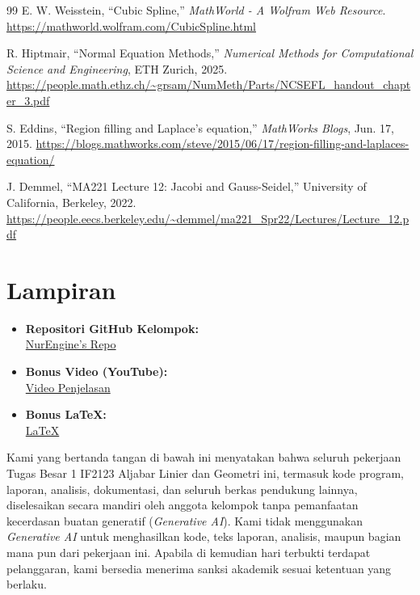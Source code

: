 \documentclass[12pt,a4paper]{report}
\begin{document}
\begin{thebibliography}{99}
E. W. Weisstein, ``Cubic Spline,'' \textit{MathWorld - A Wolfram Web Resource}.
\url{https://mathworld.wolfram.com/CubicSpline.html}

R. Hiptmair, ``Normal Equation Methods,'' \textit{Numerical Methods for Computational Science and Engineering}, ETH Zurich, 2025.
\url{https://people.math.ethz.ch/~grsam/NumMeth/Parts/NCSEFL_handout_chapter_3.pdf}

S. Eddins, ``Region filling and Laplace's equation,'' \textit{MathWorks Blogs}, Jun. 17, 2015.
\url{https://blogs.mathworks.com/steve/2015/06/17/region-filling-and-laplaces-equation/}

J. Demmel, ``MA221 Lecture 12: Jacobi and Gauss-Seidel,'' University of California, Berkeley, 2022.
\url{https://people.eecs.berkeley.edu/~demmel/ma221_Spr22/Lectures/Lecture_12.pdf}

\end{thebibliography}

\clearpage
\section*{Lampiran}

\begin{itemize}
    \item \textbf{Repositori GitHub Kelompok:} \\
          \href{https://github.com/aseyy/algeo26-tb1-04}
               {NurEngine's Repo}
          
    \item \textbf{Bonus Video (YouTube):} \\
          \href{https://youtu.be/it1JFK8Qt5o}
               {Video Penjelasan}
          
    \item \textbf{Bonus \LaTeX:} \\
          \href{https://github.com/aseyy/algeo26-tb1-04/blob/main/docs/main.tex}
               {LaTeX}
\end{itemize}

\noindent Kami yang bertanda tangan di bawah ini menyatakan bahwa seluruh pekerjaan Tugas Besar 1
IF2123 Aljabar Linier dan Geometri ini, termasuk kode program, laporan, analisis, dokumentasi,
dan seluruh berkas pendukung lainnya, diselesaikan secara mandiri oleh anggota kelompok tanpa
pemanfaatan kecerdasan buatan generatif (\emph{Generative AI}). Kami tidak menggunakan
\emph{Generative AI} untuk menghasilkan kode, teks laporan, analisis, maupun bagian mana pun dari
pekerjaan ini. Apabila di kemudian hari terbukti terdapat pelanggaran, kami bersedia menerima
sanksi akademik sesuai ketentuan yang berlaku.
\end{document}
